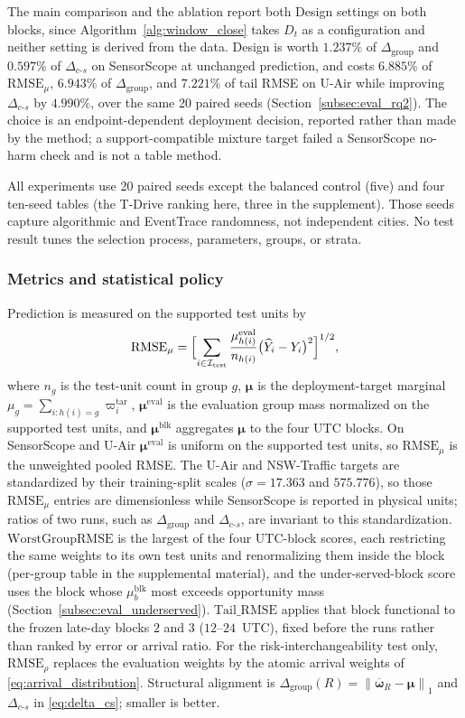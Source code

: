 \documentclass[letterpaper,journal]{IEEEtran}
\begin{document}
The main comparison and the ablation report both Design settings on both blocks,
since Algorithm~\ref{alg:window_close} takes $D_t$ as a configuration and neither
setting is derived from the data.  Design is worth $1.237\%$ of
$\Delta_{\mathrm{group}}$ and $0.597\%$ of $\Delta_{c\text{-}s}$ on SensorScope at
unchanged prediction, and costs $6.885\%$ of $\mathrm{RMSE}_{\mu}$, $6.943\%$ of
$\Delta_{\mathrm{group}}$, and $7.221\%$ of tail RMSE on U-Air while improving
$\Delta_{c\text{-}s}$ by $4.990\%$, over the same 20 paired seeds
(Section~\ref{subsec:eval_rq2}).  The choice is an endpoint-dependent deployment
decision, reported rather than made by the method; a support-compatible mixture
target failed a SensorScope no-harm check and is not a table method.

All experiments use 20 paired seeds except the balanced control (five) and four ten-seed tables (the T-Drive
ranking here, three in the supplement).  Those seeds capture algorithmic and EventTrace randomness, not independent
cities.  No test result tunes the selection process, parameters, groups, or strata.

\subsubsection{Metrics and statistical policy}

Prediction is measured on the supported test units by
\[
 \mathrm{RMSE}_{\mu}
 =
 \Bigl[\sum_{i\in\mathcal{I}_{\mathrm{test}}}
 \frac{\mu^{\mathrm{eval}}_{h(i)}}{n_{h(i)}}
 \bigl(\widehat Y_i-Y_i\bigr)^2\Bigr]^{1/2},
\]
where $n_g$ is the test-unit count in group $g$, $\boldsymbol\mu$ is the
deployment-target marginal $\mu_g=\sum_{i:h(i)=g}\varpi_i^{\mathrm{tar}}$,
$\boldsymbol\mu^{\mathrm{eval}}$ is the evaluation group mass normalized on
the supported test units, and $\boldsymbol\mu^{\mathrm{blk}}$ aggregates
$\boldsymbol\mu$ to the four UTC blocks.  On SensorScope and U-Air
$\boldsymbol\mu^{\mathrm{eval}}$ is uniform on the supported test units, so
$\mathrm{RMSE}_{\mu}$ is the unweighted pooled RMSE.
The U-Air and NSW-Traffic targets are standardized by their training-split
scales ($\sigma=17.363$ and $575.776$), so those $\mathrm{RMSE}_{\mu}$ entries
are dimensionless while SensorScope is reported in physical units; ratios of two
runs, such as $\Delta_{\mathrm{group}}$ and $\Delta_{c\text{-}s}$, are invariant
to this standardization.  $\mathrm{WorstGroupRMSE}$ is the largest of the four
UTC-block scores, each restricting the same weights to its own test units and
renormalizing them inside the block (per-group table in the supplemental
material), and the under-served-block score uses the block whose
$\mu^{\mathrm{blk}}_b$ most exceeds opportunity mass
(Section~\ref{subsec:eval_underserved}).  $\mathrm{Tail\_RMSE}$ applies that
block functional to the frozen late-day blocks $2$ and $3$ ($12$--$24$~UTC),
fixed before the runs rather than ranked by error or arrival ratio.  For the
risk-interchangeability test only, $\mathrm{RMSE}_{\rho}$ replaces the evaluation
weights by the atomic arrival weights of \eqref{eq:arrival_distribution}.
Structural alignment is
$\Delta_{\mathrm{group}}(R)=\left\|\overline{\boldsymbol\omega}_R-\boldsymbol\mu\right\|_1$
and $\Delta_{c\text{-}s}$ in \eqref{eq:delta_cs}; smaller is better.
\end{document}
